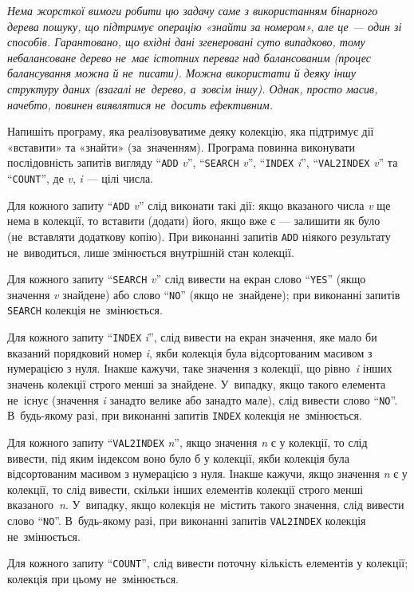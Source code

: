 ﻿{\it Нема жорсткої вимоги робити цю задачу саме з використанням бінарного дерева пошуку, що підтримує операцію «знайти за номером», але це --- один зі способів. Гарантовано, що вхідні дані згенеровані суто випадково, тому небалансоване дерево не~має істотних переваг над балансованим (процес балансування можна й не~писати). Можна використати й деяку іншу структуру даних (взагалі не~дерево, а~зовсім іншу). Однак, просто масив, начебто, повинен виявлятися не~досить ефективним.}

Напишіть програму, яка реалізовуватиме деяку колекцію, яка підтримує дії «вставити» та «знайти» (за~значенням). Програма повинна виконувати  послідовність запитів вигляду ``{\tt ADD} {\it v}'', ``{\tt SEARCH} {\it v}'', ``{\tt INDEX} {\it i}'', ``{\tt VAL2INDEX} {\it v}'' та ``{\tt COUNT}'', де {\it v}, {\it i} --- цілі числа.

Для кожного запиту ``{\tt ADD} {\it v}'' слід виконати такі дії: якщо вказаного числа {\it v} ще нема в колекції, то вставити (додати) його, якщо вже є --- залишити як було (не~вставляти додаткову копію). При виконанні запитів {\tt ADD} ніякого результату не~виводиться, лише змінюється внутрішній стан колекції.

Для кожного запиту ``{\tt SEARCH} {\it v}'' слід вивести на екран слово ``{\tt YES}'' (якщо значення {\it v} знайдене) або слово ``{\tt NO}'' (якщо не~знайдене); при виконанні запитів {\tt SEARCH} колекція не~змінюється.

Для кожного запиту ``{\tt INDEX} {\it i}'', слід вивести на екран значення, яке мало би вказаний порядковий номер {\it i}, якби колекція була відсортованим масивом з нумерацією з нуля. Інакше кажучи, таке значення з колекції, що рівно~{\it i} інших значень колекції строго менші за знайдене. У~випадку, якщо такого елемента не~існує (значення {\it i} занадто велике або занадто мале), слід вивести слово ``{\tt NO}''. В~будь-якому разі, при виконанні запитів {\tt INDEX} колекція не~змінюється.

Для кожного запиту ``{\tt VAL2INDEX} {\it n}'', якщо значення {\it n} є у колекції, то слід вивести, під яким індексом воно було б у колекції, якби колекція була відсортованим масивом з нумерацією з нуля. Інакше кажучи, якщо значення {\it n} є у колекції, то слід вивести, скільки інших елементів колекції строго менші вказаного~{\it n}. У~випадку, якщо колекція не~містить такого значення, слід вивести слово ``{\tt NO}''. В~будь-якому разі, при виконанні запитів {\tt VAL2INDEX} колекція не~змінюється.

Для кожного запиту ``{\tt COUNT}'', слід вивести поточну кількість елементів у колекції; колекція при цьому не~змінюється.


